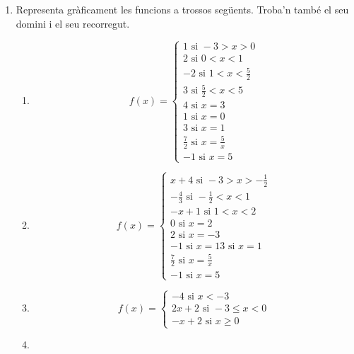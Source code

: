 \documentclass{article}
\begin{document}
	\author{Mireia Dosil}
	\date{text}



\begin{enumerate}
 

\item Representa gràficament les funcions a trossos següents. Troba'n també el seu domini i el seu recorregut.

\begin{enumerate}
	\item 
	$$f(x)=
	\begin{cases}
	1 \mbox{ si } -3 > x > 0 \\
	2 \mbox{ si } 0 < x < 1 \\
	-2 \mbox{ si } 1 < x <\frac{5}{2}\\
	3 \mbox{ si } \frac{5}{2} < x < 5\\
	4 \mbox{ si } x=3 \\
	1 \mbox{ si } x=0 \\
	3 \mbox{ si } x=1 \\
	\frac{7}{2} \mbox{ si } x=\frac{5}{x} \\
	-1 \mbox{ si } x= 5
	\end{cases}
	$$
	
	\item
	
	$$
	f(x)=
	\begin{cases}
	x+4 \mbox{ si } -3 > x > -\frac{1}{2} \\
	-\frac{4}{3} \mbox{ si } -\frac{1}{2} < x < 1 \\
	-x+1 \mbox{ si } 1 < x <2\\
	0 \mbox{ si } x=2\\
	2 \mbox{ si } x=-3 \\
	-1 \mbox{ si } x=1 
	3 \mbox{ si } x=1 \\
	\frac{7}{2} \mbox{ si } x=\frac{5}{x} \\
	-1 \mbox{ si } x= 5
		\end{cases}
	$$
	
	\item
	
	
	$$
	f(x)=
	\begin{cases}
	-4 \mbox{ si } x < -3 \\
	2x+2 \mbox{ si } -3 \le x < 0 \\
	-x+2 \mbox{ si } x \ge 0
	
	\end{cases}
	$$
	
	
	\item
	

\end{enumerate}
\end{enumerate}
\end{document}
